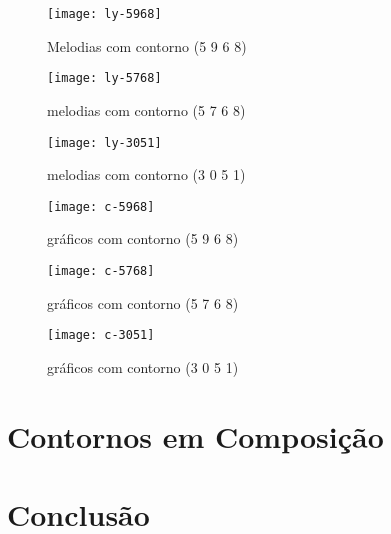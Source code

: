 \documentclass{sciposter}
\begin{document}
\begin{center}

\begin{multicols}{2}

\begin{figure}
  \centering
  \texttt{[image: ly-5968]}
  \label{fig:ly-cseg-5968}
  \caption{Melodias com contorno (5 9 6 8)}
\end{figure}
\begin{figure}
  \centering
  \texttt{[image: ly-5768]}
  \label{fig:ly-cseg-5768}
  \caption{melodias com contorno (5 7 6 8)}
\end{figure}
\begin{figure}
  \centering
    \texttt{[image: ly-3051]}
    \label{fig:ly-cseg-3051}
    \caption{melodias com contorno (3 0 5 1)}
  \label{fig:melodias-cseg}
\end{figure}

\begin{figure}
  \centering
  \texttt{[image: c-5968]}
  \label{fig:ly-cseg-5968}
  \caption{gráficos com contorno (5 9 6 8)}
\end{figure}

\begin{figure}
  \centering
  \texttt{[image: c-5768]}
  \label{fig:ly-cseg-5768}
  \caption{gráficos com contorno (5 7 6 8)}
\end{figure}

\begin{figure}
  \centering
    \texttt{[image: c-3051]}
    \label{fig:ly-cseg-3051}
    \caption{gráficos com contorno (3 0 5 1)}
  \label{fig:melodias-cseg}
\end{figure}

\end{multicols}

\end{center}

\begin{multicols}{3}

\section{Contornos em Composição}

\section{Conclusão}

\renewcommand{\refname}{Bibliografia}




\end{multicols}
\end{document}

